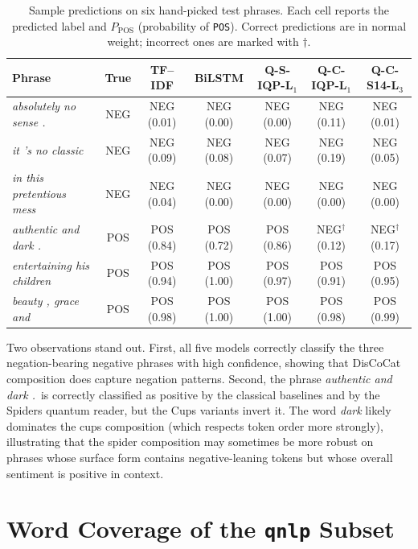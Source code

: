 \documentclass[runningheads]{llncs}
\begin{document}
\begin{table}[h!]
\centering
\caption{Sample predictions on six hand-picked test phrases. Each cell
reports the predicted label and \(P_{\text{POS}}\) (probability of
\texttt{POS}). Correct predictions are in normal weight; incorrect ones
are marked with \(\dagger\).}
\label{tab:samples}
\setlength{\tabcolsep}{3pt}
\footnotesize
\begin{tabular}{lcccccc}
\toprule
Phrase & True & TF--IDF & BiLSTM & Q-S-IQP-L\(_1\) & Q-C-IQP-L\(_1\) & Q-C-S14-L\(_3\) \\
\midrule
\emph{absolutely no sense .}        & NEG & NEG (0.01) & NEG (0.00) & NEG (0.00) & NEG (0.11) & NEG (0.01) \\
\emph{it 's no classic}             & NEG & NEG (0.09) & NEG (0.08) & NEG (0.07) & NEG (0.19) & NEG (0.05) \\
\emph{in this pretentious mess}     & NEG & NEG (0.04) & NEG (0.00) & NEG (0.00) & NEG (0.00) & NEG (0.00) \\
\emph{authentic and dark .}         & POS & POS (0.84) & POS (0.72) & POS (0.86) & NEG\(^\dagger\) (0.12) & NEG\(^\dagger\) (0.17) \\
\emph{entertaining his children}    & POS & POS (0.94) & POS (1.00) & POS (0.97) & POS (0.91) & POS (0.95) \\
\emph{beauty , grace and}           & POS & POS (0.98) & POS (1.00) & POS (1.00) & POS (0.98) & POS (0.99) \\
\bottomrule
\end{tabular}
\end{table}

Two observations stand out. First, all five models correctly
classify the three negation-bearing negative phrases with high
confidence, showing that DisCoCat composition does capture negation
patterns. Second, the phrase \emph{authentic and dark .}\ is correctly
classified as positive by the classical baselines and by the Spiders
quantum reader, but the Cups variants invert it. The word \emph{dark}
likely dominates the cups composition (which respects token order more
strongly), illustrating that the spider composition may sometimes be
more robust on phrases whose surface form contains negative-leaning
tokens but whose overall sentiment is positive in context.

\section{Word Coverage of the \texttt{qnlp} Subset}\label{app:vocab}
\end{document}
